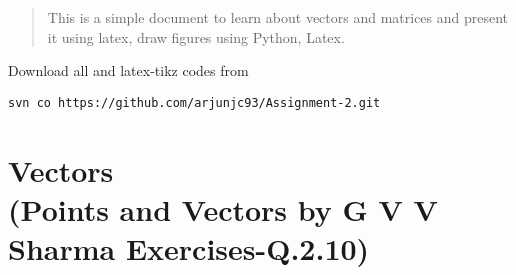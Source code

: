 \documentclass[journal,12pt,twocolumn]{IEEEtran}
\begin{document}
\newpage
\bigskip
\renewcommand{\thefigure}{\theenumi}
\renewcommand{\thetable}{\theenumi}
\begin{abstract}
This is a simple document to learn about vectors and matrices and present it using latex, draw figures using Python, Latex.
\end{abstract}
%
Download all and latex-tikz codes from 
%
\begin{lstlisting}
svn co https://github.com/arjunjc93/Assignment-2.git
\end{lstlisting}
%
\section{Vectors\\(Points and Vectors by G V V Sharma Exercises-Q.2.10)}
\renewcommand{\theequation}{\theenumi}
\end{document}
